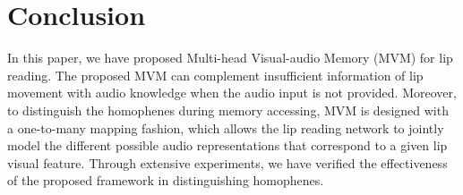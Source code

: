 \documentclass[letterpaper]{article} \usepackage{aaai22}  \usepackage{times}  \usepackage{helvet}  \usepackage{courier}  \usepackage[hyphens]{url}  \usepackage{graphicx} \urlstyle{rm} \def\UrlFont{\rm}  \usepackage{natbib}  \usepackage{caption} \DeclareCaptionStyle{ruled}{labelfont=normalfont,labelsep=colon,strut=off} \frenchspacing  \setlength{\pdfpagewidth}{8.5in}  \setlength{\pdfpageheight}{11in}  \usepackage{algorithm}
\begin{document}
\section{Conclusion}
In this paper, we have proposed Multi-head Visual-audio Memory (MVM) for lip reading. The proposed MVM can complement insufficient information of lip movement with audio knowledge when the audio input is not provided. Moreover, to distinguish the homophenes during memory accessing, MVM is designed with a one-to-many mapping fashion, which allows the lip reading network to jointly model the different possible audio representations that correspond to a given lip visual feature. Through extensive experiments, we have verified the effectiveness of the proposed framework in distinguishing homophenes.


\end{document}
